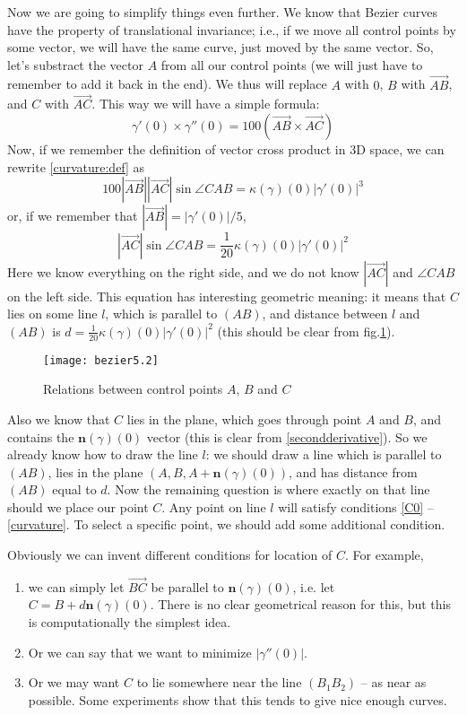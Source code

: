 \documentclass[12pt,a4paper]{article}
\newcommand{\vc}{\overrightarrow}
\begin{document}
Now we are going to simplify things even further. We know that Bezier curves have the property of translational invariance; i.e., if we move all control points by some vector, we will have the same curve, just moved by the same vector. So, let's substract the vector $A$ from all our control points (we will just have to remember to add it back in the end). We thus will replace $A$ with $0$, $B$ with $\vc{AB}$, and $C$ with $\vc{AC}$. This way we will have a simple formula:
\begin{equation}
\gamma'(0)\times\gamma''(0) = 100(\vc{AB}\times\vc{AC})
\end{equation}
Now, if we remember the definition of vector cross product in 3D space, we can rewrite \eqref{curvature:def} as
$$
100|\vc{AB}||\vc{AC}|\sin\angle CAB = \kappa(\gamma)(0)|\gamma'(0)|^3
$$
or, if we remember that $|\vc{AB}| = |\gamma'(0)|/5$,
\begin{equation}\label{star2}
  |\vc{AC}|\sin\angle CAB = \frac{1}{20}\kappa(\gamma)(0)|\gamma'(0)|^2
\end{equation}
Here we know everything on the right side, and we do not know $|\vc{AC}|$ and $\angle CAB$ on the left side.
This equation has interesting geometric meaning: it means that $C$ lies on some line $l$, which is parallel to $(AB)$, and distance between $l$ and $(AB)$ is $d = \frac{1}{20}\kappa(\gamma)(0)|\gamma'(0)|^2$ (this should be clear from fig.\ref{fig:points}).

\begin{figure}[h]
  \caption{Relations between control points $A$, $B$ and $C$}
  \label{fig:points}
  \texttt{[image: bezier5.2]}
  \centering
\end{figure}

Also we know that $C$ lies in the plane, which goes through point $A$ and $B$, and contains the $\mathbf{n}(\gamma)(0)$ vector (this is clear from \eqref{secondderivative}). So we already know how to draw the line $l$: we should draw a line which is parallel to $(AB)$, lies in the plane $(A, B, A + \mathbf{n}(\gamma)(0))$, and has distance from $(AB)$ equal to $d$. Now the remaining question is where exactly on that line should we place our point $C$. Any point on line $l$ will satisfy conditions \eqref{C0} -- \eqref{curvature}. To select a specific point, we should add some additional condition.

Obviously we can invent different conditions for location of $C$. For example,
\begin{enumerate}
  \item we can simply let $\vc{BC}$ be parallel to $\mathbf{n}(\gamma)(0)$, i.e. let $C = B + d\mathbf{n}(\gamma)(0)$. There is no clear geometrical reason for this, but this is computationally the simplest idea.
  \item Or we can say that we want to minimize $|\gamma''(0)|$.
  \item Or we may want $C$ to lie somewhere near the line $(B_1B_2)$ -- as near as possible. Some experiments show that this tends to give nice enough curves.
\end{enumerate}
\end{document}
